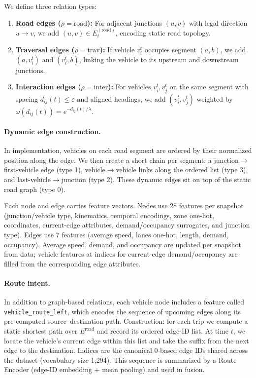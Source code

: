 We define three relation types:
\begin{enumerate}
    \item \textbf{Road edges ($\rho=\text{road}$):} For adjacent junctions $(u,v)$ with legal direction $u\!\to\!v$, we add $(u,v)\in E_t^{(\text{road})}$, encoding static road topology.
    \item \textbf{Traversal edges ($\rho=\text{trav}$):} If vehicle $v_i^t$ occupies segment $(a,b)$, we add $(a,v_i^t)$ and $(v_i^t,b)$, linking the vehicle to its upstream and downstream junctions.
    \item \textbf{Interaction edges ($\rho=\text{inter}$):} For vehicles $v_i^t,v_j^t$ on the same segment with spacing $d_{ij}(t)\le\varepsilon$ and aligned headings, we add $(v_i^t,v_j^t)$ weighted by $\omega(d_{ij}(t)) = e^{-d_{ij}(t)/\lambda}$.
\end{enumerate}

\paragraph{Dynamic edge construction.}
In implementation, vehicles on each road segment are ordered by their normalized position along the edge. We then create a short chain per segment: a junction$\to$first-vehicle edge (type 1), vehicle$\to$vehicle links along the ordered list (type 3), and last-vehicle$\to$junction (type 2). These dynamic edges sit on top of the static road graph (type 0).

Each node and edge carries feature vectors. Nodes use 28 features per snapshot (junction/vehicle type, kinematics, temporal encodings, zone one-hot, coordinates, current-edge attributes, demand/occupancy surrogates, and junction type). Edges use 7 features (average speed, lanes one-hot, length, demand, occupancy). Average speed, demand, and occupancy are updated per snapshot from data; vehicle features at indices for current-edge demand/occupancy are filled from the corresponding edge attributes.

\paragraph{Route intent.}
In addition to graph-based relations, each vehicle node includes a feature called \texttt{vehicle\_route\_left}, which encodes the sequence of upcoming edges along its pre-computed source--destination path. Construction: for each trip we compute a static shortest path over $E^{\mathrm{road}}$ and record its ordered edge-ID list. At time $t$, we locate the vehicle's current edge within this list and take the suffix from the next edge to the destination. Indices are the canonical 0-based edge IDs shared across the dataset (vocabulary size 1{,}294). This sequence is summarized by a Route Encoder (edge-ID embedding + mean pooling) and used in fusion.

